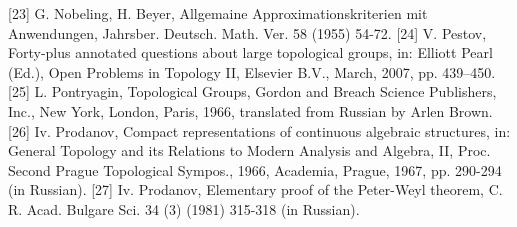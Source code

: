 \documentclass[12pt]{article}
\begin{document}
[23] G. Nobeling, H. Beyer, Allgemaine Approximationskriterien mit Anwendungen, Jahrsber. Deutsch. Math. Ver. 58 (1955) 54-72.
[24] V. Pestov, Forty-plus annotated questions about large topological groups, in: Elliott Pearl (Ed.), Open Problems in Topology II, Elsevier B.V., March,
2007, pp. 439–450.
[25] L. Pontryagin, Topological Groups, Gordon and Breach Science Publishers, Inc., New York, London, Paris, 1966, translated from Russian by Arlen Brown.
[26] Iv. Prodanov, Compact representations of continuous algebraic structures, in: General Topology and its Relations to Modern Analysis and Algebra, II,
Proc. Second Prague Topological Sympos., 1966, Academia, Prague, 1967, pp. 290-294 (in Russian).
[27] Iv. Prodanov, Elementary proof of the Peter-Weyl theorem, C. R. Acad. Bulgare Sci. 34 (3) (1981) 315-318 (in Russian).
\end{document}
